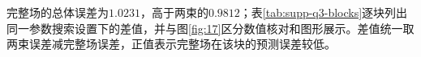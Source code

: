完整场的总体误差为$1.0231$，高于两束的$0.9812$；表\ref{tab:supp-q3-blocks}逐块列出同一参数搜索设置下的差值，并与图\ref{fig:17}区分数值核对和图形展示。差值统一取两束误差减完整场误差，正值表示完整场在该块的预测误差较低。

